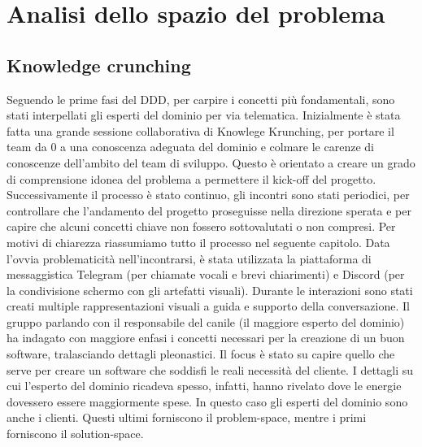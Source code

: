 \chapter{Analisi dello spazio del problema}

	\section{Knowledge crunching}
	Seguendo le prime fasi del DDD, per carpire i concetti più fondamentali, sono stati interpellati gli esperti del dominio per via telematica. 
	Inizialmente è stata fatta una grande sessione collaborativa di Knowlege Krunching, per portare il team da 0 a una conoscenza adeguata del dominio e colmare le carenze di conoscenze dell'ambito del team di sviluppo. Questo è orientato a creare un grado di comprensione idonea del problema a permettere il kick-off del progetto.  
	Successivamente il processo è stato continuo, gli incontri sono stati periodici, per controllare che l'andamento del progetto proseguisse nella direzione sperata e per capire che alcuni concetti chiave non fossero sottovalutati o non compresi. 
	Per motivi di chiarezza riassumiamo tutto il processo nel seguente capitolo.
	Data l'ovvia problematicità nell'incontrarsi, è stata utilizzata la piattaforma di messaggistica Telegram (per chiamate vocali e brevi chiarimenti) e Discord (per la condivisione schermo con gli artefatti visuali). Durante le interazioni sono stati creati multiple rappresentazioni visuali a guida e supporto della conversazione. 
	Il gruppo parlando con il responsabile del canile (il maggiore esperto del dominio) ha indagato con maggiore enfasi i concetti necessari per la creazione di un buon software, tralasciando dettagli pleonastici. Il focus è stato su capire quello che serve per creare un software che soddisfi le reali necessità del cliente. I dettagli su cui l'esperto del dominio ricadeva spesso, infatti, hanno rivelato dove le energie dovessero essere maggiormente spese. 
	In questo caso gli esperti del dominio sono anche i clienti. Questi ultimi forniscono il problem-space, mentre i primi forniscono il solution-space.
	

